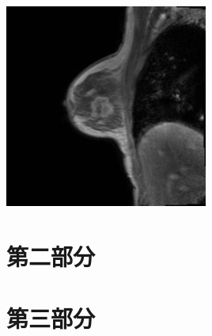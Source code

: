 \documentclass{beamer}
\begin{document}
\begin{frame}
\hspace{-0.7cm}
\begin{minipage}{1\textwidth}
	\centering
		\includegraphics[width=0.5\textwidth]{breast.png}
\end{minipage}
\end{frame}

\section{第二部分}
    \begin{frame}
    \end{frame}

\begin{frame}
	
\end{frame}

\section{第三部分}
    \begin{frame}
    \end{frame}

\begin{frame}
	
\end{frame}
\end{document}
